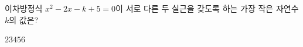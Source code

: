 이차방정식 $x^2-2x-k+5=0$이 서로 다른 두 실근을 갖도록 하는 가장 작은 자연수 $k$의 값은?
\begin{choices32}{$2$}{$3$}{$4$}{$5$}{$6$}\end{choices32}
